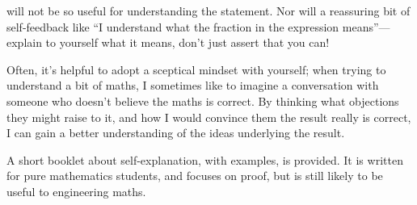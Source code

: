 \documentclass{article}
\begin{document}
will not be so useful for understanding the statement. Nor will a reassuring bit of self-feedback like ``I understand what the fraction in the expression means''---explain to yourself what it means, don't just assert that you can!\bigskip


Often, it's helpful to adopt a sceptical mindset with yourself; when trying to understand a bit of maths, I sometimes like to imagine a conversation with someone who doesn't believe the maths is correct. By thinking what objections they might raise to it, and how I would convince them the result really is correct, I can gain a better understanding of the ideas underlying the result.\bigskip

A short booklet about self-explanation, with examples, is provided. It is written for pure mathematics students, and focuses on proof, but is still likely to be useful to engineering maths.
\end{document}
